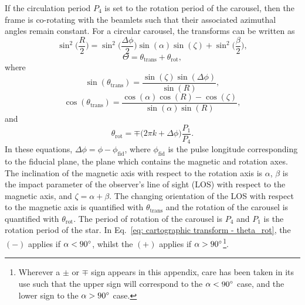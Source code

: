 If the circulation period $P_4$ is set to the rotation period of the carousel, then the frame is co-rotating with the beamlets such that their associated azimuthal angles remain constant. For a circular carousel, the transforms can be written as
\begin{equation}
    \label{eq: cartographic transform - R}
    \sin^2\bigg(\frac{R}{2}\bigg) = \sin^2\bigg(  \frac{\Delta\phi}{2} \bigg)\sin(\alpha)\sin(\zeta) + \sin^2\bigg(\frac{\beta}{2} \bigg),
\end{equation}
\begin{equation}
    \label{eq: cartographic transform - Theta}
    \Theta = \theta_\mathrm{trans} + \theta_\mathrm{rot},
\end{equation}
    where
\begin{equation}
    \label{eq: cartographic transform - sin theta_trans}
    \sin(\theta_\mathrm{trans}) = \frac{\sin(\zeta)\sin(\Delta\phi)}{\sin(R)},
\end{equation}
\begin{equation}
    \label{eq: cartographic transform - cos theta_trans}
    \cos(\theta_\mathrm{trans}) = \frac{\cos(\alpha)\cos(R) - \cos(\zeta)}{\sin(\alpha)\sin(R)},
\end{equation}
    and
\begin{equation}
    \label{eq: cartographic transform - theta_rot}
    \theta_\mathrm{rot} =  \mp \bigg(2\pi k + \Delta\phi\bigg)\frac{P_1}{P_4}.
\end{equation}
In these equations, $\Delta\phi = \phi - \phi_\mathrm{fid}$, where $\phi_\mathrm{fid}$ is the pulse longitude corresponding to the fiducial plane, the plane which contains the magnetic and rotation axes. The inclination of the magnetic axis with respect to the rotation axis is $\alpha$, $\beta$ is the impact parameter of the observer's line of sight (LOS) with respect to the magnetic axis, and $\zeta = \alpha + \beta$. The changing orientation of the LOS with respect to the magnetic axis is quantified with $\theta_\mathrm{trans}$ and the rotation of the carousel is quantified with $\theta_\mathrm{rot}$. The period of rotation of the carousel is $P_4$ and $P_1$ is the rotation period of the star. In Eq.~\eqref{eq: cartographic transform - theta_rot}, the $(-)$ applies if $\alpha<90^\circ$, whilst the $(+)$ applies if $\alpha>90^\circ$\footnote{Wherever a $\pm$ or $\mp$ sign appears in this appendix, care has been taken in its use such that the upper sign will correspond to the $\alpha < 90^\circ$ case, and the lower sign to the $\alpha > 90^\circ$ case.}.

